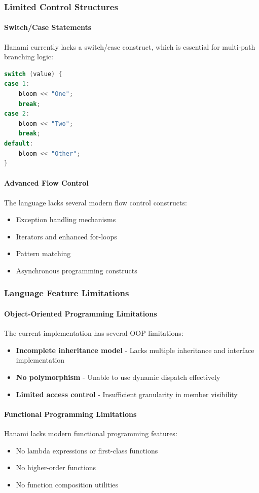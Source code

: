 \documentclass[conference]{IEEEtran}
\begin{document}
\subsubsection{Limited Control Structures}
\paragraph{Switch/Case Statements}
Hanami currently lacks a switch/case construct, which is essential for multi-path branching logic:
\begin{lstlisting}[language=C++, caption={Desired switch/case example}, label={lst:desired_switch_case}, basicstyle=\ttfamily\scriptsize, columns=flexible]
switch (value) {
case 1:
    bloom << "One";
    break;
case 2:
    bloom << "Two";
    break;
default:
    bloom << "Other";
}
\end{lstlisting}
\paragraph{Advanced Flow Control}
The language lacks several modern flow control constructs:
\begin{itemize}
\item Exception handling mechanisms
\item Iterators and enhanced for-loops
\item Pattern matching
\item Asynchronous programming constructs
\end{itemize}
\subsubsection{Language Feature Limitations}
\paragraph{Object-Oriented Programming Limitations}
The current implementation has several OOP limitations:
\begin{itemize}
\item \textbf{Incomplete inheritance model} - Lacks multiple inheritance and interface implementation
\item \textbf{No polymorphism} - Unable to use dynamic dispatch effectively
\item \textbf{Limited access control} - Insufficient granularity in member visibility
\end{itemize}
\paragraph{Functional Programming Limitations}
Hanami lacks modern functional programming features:
\begin{itemize}
\item No lambda expressions or first-class functions
\item No higher-order functions
\item No function composition utilities
\end{itemize}
\end{document}
